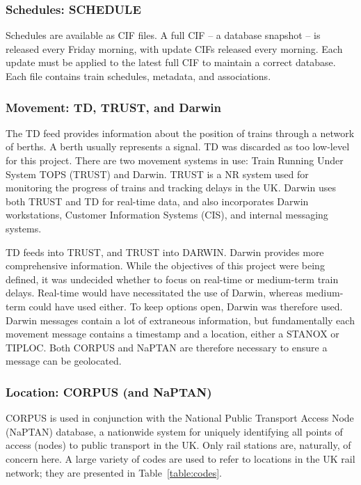 \documentclass[12pt,a4paper]{article}
\begin{document}
\subsubsection{Schedules: SCHEDULE}

Schedules are available as CIF files. A full CIF – a database snapshot – is released every Friday morning, with update CIFs released every morning. Each update must be applied to the latest full CIF to maintain a correct database. Each file contains train schedules, metadata, and associations.

\subsubsection{Movement: TD, TRUST, and Darwin}

The TD feed provides information about the position of trains through a network of berths. A berth usually represents a signal. TD was discarded as too low-level for this project. There are two movement systems in use: Train Running Under System TOPS (TRUST) and Darwin. TRUST is a NR system used for monitoring the progress of trains and tracking delays in the UK. Darwin uses both TRUST and TD for real-time data, and also incorporates Darwin workstations, Customer Information Systems (CIS), and internal messaging systems.

TD feeds into TRUST, and TRUST into DARWIN. Darwin provides more comprehensive information. While the objectives of this project were being defined, it was undecided whether to focus on real-time or medium-term train delays. Real-time would have necessitated the use of Darwin, whereas medium-term could have used either. To keep options open, Darwin was therefore used. Darwin messages contain a lot of extraneous information, but fundamentally each movement message contains a timestamp and a location, either a STANOX or TIPLOC. Both CORPUS and NaPTAN are therefore necessary to ensure a message can be geolocated.

\subsubsection{Location: CORPUS (and NaPTAN)}

CORPUS is used in conjunction with the National Public Transport Access Node (NaPTAN) database, a nationwide system for uniquely identifying all points of access (nodes) to public transport in the UK. Only rail stations are, naturally, of concern here. A large variety of codes are used to refer to locations in the UK rail network; they are presented in Table~\ref{table:codes}.
\end{document}
